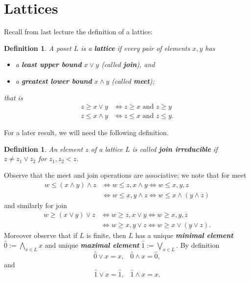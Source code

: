\documentclass[11pt]{article}
\newtheorem{definition}[theorem]{Definition}
\newcommand{\It}[1]{\textit{#1}}
\newcommand{\Bf}[1]{\textbf{#1}}
\newcommand{\wed}{\wedge}
\newcommand{\keyword}[1]{\Bf{\It{#1}}}
\begin{document}
\section*{Lattices}
Recall from last lecture the definition of a lattice:
\begin{definition}
    A poset $L$ is a \keyword{lattice} if every pair of elements $x,y$ has
    \begin{itemize}
        \item[(i)] a \keyword{least upper bound} $x \vee y$ (called \keyword{join}), and
        \item[(ii)] a \keyword{greatest lower bound} $x \wedge y$ (called \keyword{meet});
    \end{itemize}
    that is
    \begin{align*}
        z \geq x \vee y &\iff z \geq x \text{ and } z \geq y \\
        z \leq x \wedge y &\iff z \leq x \text{ and } z \leq y .
    \end{align*}
\end{definition}
For a later result, we will need the following definition.
\begin{definition}
An element $z$ of a lattice $L$ is called \keyword{join irreducible} if $z \neq z_1 \vee z_2$ for $z_1, z_2 <z$.
\end{definition}
Observe that the meet and join operations are associative; we note that for meet
\begin{align*}
w \leq (x \wed y) \wed z &\Leftrightarrow w \leq z, x \wed y \Leftrightarrow w \leq x,y,z \\&\Leftrightarrow w \leq x, y \wed z \Leftrightarrow w \leq x \wed (y \wed z)
\end{align*}
and similarly for join
\begin{align*}
w \geq (x \vee y) \vee z &\Leftrightarrow w \geq z, x \vee y \Leftrightarrow w \geq x,y,z \\&\Leftrightarrow w \geq x, y \vee z \Leftrightarrow w \geq x \vee (y \vee z).
\end{align*}
Moreover observe that if $L$ is finite, then $L$ has a unique \keyword{minimal element} $\hat{0} := \bigwedge_{x \in L} x$ and unique \keyword{maximal element} $\hat{1}:=\bigvee_{x \in L}$. By definition $$\hat{0} \vee x=x, \; \; \; \hat{0} \wed x =\hat{0},$$ and $$\hat{1} \vee x=\hat{1}, \; \; \;  \hat{1} \wed x =x.$$
\end{document}
